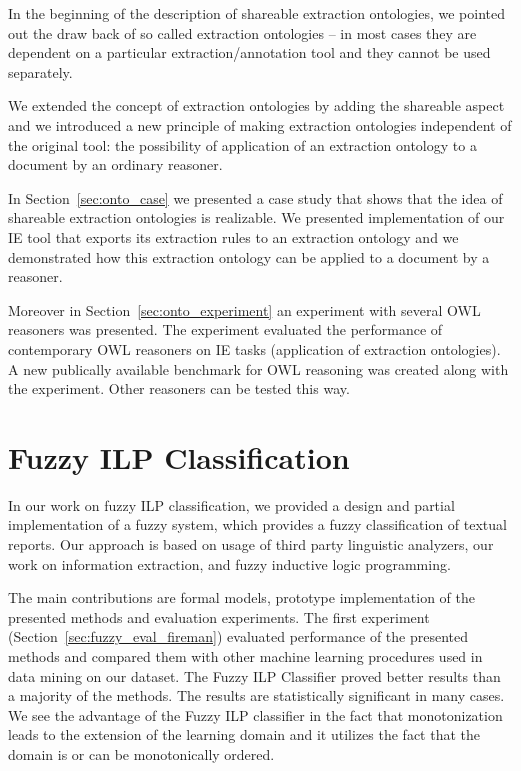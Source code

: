 In the beginning of the description of shareable extraction ontologies, we pointed out the draw back of so called extraction ontologies -- in most cases they are dependent on a particular extraction/annotation tool and they cannot be used separately.	

We extended the concept of extraction ontologies by adding the shareable aspect and we introduced a new principle of making extraction ontologies independent of the original tool: the possibility of application of an extraction ontology to a document by an ordinary reasoner.

In Section~\ref{sec:onto_case} we presented a case study that shows that the idea of shareable extraction ontologies is realizable. We presented implementation of our IE tool that exports its extraction rules to an extraction ontology and we demonstrated how this extraction ontology can be applied to a document by a reasoner.

Moreover in Section~\ref{sec:onto_experiment} an experiment with several OWL reasoners was presented. The experiment evaluated the performance of contemporary OWL reasoners on IE tasks (application of extraction ontologies). A new publically available benchmark for OWL reasoning was created along with the experiment. Other reasoners can be tested this way.




\section{Fuzzy ILP Classification} \label{sec:conclusion}


In our work on fuzzy ILP classification, we provided a design and partial implementation of a fuzzy system, which provides a fuzzy classification of textual reports. Our approach is based on usage of third party linguistic analyzers, our work on information extraction, and fuzzy inductive logic programming.

The main contributions are formal models, prototype implementation of the presented methods and evaluation experiments. The first experiment (Section~\ref{sec:fuzzy_eval_fireman}) evaluated performance of the presented methods and compared them with other machine learning procedures used in data mining on our dataset. The Fuzzy ILP Classifier proved better results than a majority of the methods. The results are statistically significant in many cases. 
We see the advantage of the Fuzzy ILP classifier in the fact that monotonization leads to the extension of the learning domain and it utilizes the fact that the domain is or can be monotonically ordered.

